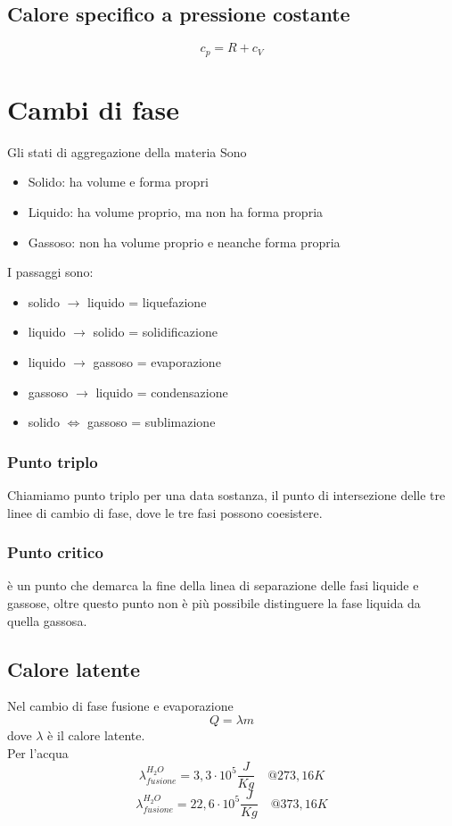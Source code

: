 \documentclass[a4paper]{report}
\begin{document}
  \subsection{Calore specifico a pressione costante}
  \[ c_p = R + c_V \]

  \section{Cambi di fase}
  Gli stati di aggregazione della materia Sono
  \begin{itemize}
    \item Solido: ha volume e forma propri
    \item Liquido: ha volume proprio, ma non ha forma propria
    \item Gassoso: non ha volume proprio e neanche forma propria
  \end{itemize}
  I passaggi sono:
  \begin{itemize}
    \item solido $\rightarrow$ liquido = liquefazione
    \item liquido $\rightarrow$ solido = solidificazione
    \item liquido $\rightarrow$ gassoso = evaporazione
    \item gassoso $\rightarrow$ liquido = condensazione
    \item solido $\iff$ gassoso = sublimazione
  \end{itemize}
  \subsubsection{Punto triplo}
  Chiamiamo punto triplo per una data sostanza, il punto di intersezione delle tre linee di cambio di fase, dove le tre fasi possono coesistere.
  \subsubsection{Punto critico}
  è un punto che demarca la fine della linea di separazione delle fasi liquide e gassose, oltre questo punto non è più possibile distinguere la fase liquida da quella gassosa.
  \subsection{Calore latente}
  Nel cambio di fase fusione e evaporazione
  \[ Q = \lambda m\]
  dove $\lambda$ è il calore latente.\\
  Per l'acqua
  \[ \lambda_{fusione}^{H_2O} = 3,3 \cdot 10^5 \frac{J}{Kg} \quad @ 273,16 K \]
  \[ \lambda_{fusione}^{H_2O} = 22,6 \cdot 10^5 \frac{J}{Kg} \quad @ 373,16K \]
\end{document}
